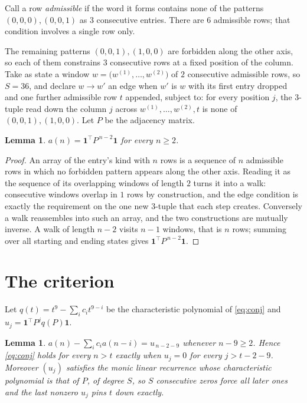 \documentclass[11pt,a4paper]{article}
\theoremstyle{plain}
\newtheorem{lemma}[theorem]{Lemma}
\theoremstyle{definition}
\begin{document}
Call a row \emph{admissible} if the word it forms contains none of the patterns
$(0,0,0), (0,0,1)$ as $3$ consecutive entries. There are $6$ admissible rows; that condition
involves a single row only.

The remaining patterns $(0,0,1), (1,0,0)$ are forbidden along the other axis, so each of them
constrains $3$ consecutive rows at a fixed position of the column. Take as state a
window $w=\bigl(w^{(1)},\dots,w^{(2)}\bigr)$ of $2$ consecutive admissible
rows, so $S=36$, and declare $w\to w'$ an edge when $w'$ is $w$ with its first entry
dropped and one further admissible row $t$ appended, subject to: for every position
$j$, the $3$-tuple read down the column $j$ across $w^{(1)},\dots,w^{(2)},t$
is none of $(0,0,1), (1,0,0)$. Let $P$ be the adjacency matrix.

\begin{lemma}\label{lem:walk}
$a(n)=\mathbf{1}^{\!\top}P^{\,n-2}\mathbf{1}$ for every $n\ge2$.
\end{lemma}

\begin{proof}
An array of the entry's kind with $n$ rows is a sequence of $n$ admissible rows in
which no forbidden pattern appears along the other axis. Reading it as the sequence of its
overlapping windows of length $2$ turns it into a walk: consecutive windows overlap in
$1$ rows by construction, and the edge condition is exactly the requirement on the one
new $3$-tuple that each step creates. Conversely a walk reassembles into such an array,
and the two constructions are mutually inverse. A walk of length $n-2$ visits $n-1$
windows, that is $n$ rows; summing over all starting and ending states gives
$\mathbf{1}^{\!\top}P^{\,n-2}\mathbf{1}$.
\end{proof}

\section{The criterion}

Let $q(t)=t^{9}-\sum_i c_i t^{9-i}$ be the characteristic polynomial of
\eqref{eq:conj} and $u_j=\mathbf{1}^{\!\top}P^{j}q(P)\mathbf{1}$.

\begin{lemma}\label{lem:crit}
$a(n)-\sum_i c_i a(n-i)=u_{\,n-2-9}$ whenever $n-9\ge2$. Hence
\eqref{eq:conj} holds for every $n>t$ exactly when $u_j=0$ for every
$j>t-2-9$. Moreover $(u_j)$ satisfies the monic linear recurrence whose
characteristic polynomial is that of $P$, of degree $S$, so $S$ consecutive zeros force all
later ones and the last nonzero $u_j$ pins $t$ down exactly.
\end{lemma}
\end{document}
